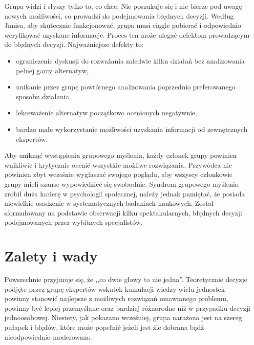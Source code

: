 Grupa widzi i słyszy tylko to, co chce. Nie poszukuje się i nie bierze pod uwagę 
nowych możliwości, co prowadzi do podejmowania błędnych decyzji. Według Janisa, 
aby skutecznie funkcjonować, grupa musi ciągle pobierać i odpowiednio
weryfikować uzyskane informacje. Proces ten może ulegać defektom prowadzącym do
błędnych decyzji. Najważniejsze defekty to:

\begin{itemize}
  \item ograniczenie dyskusji do rozważania zaledwie kilku działań bez
  analizowania pełnej gamy alternatyw,
  \item unikanie przez grupę powtórnego analizowania poprzednio preferowanego
  sposobu działania,
  \item lekceważenie alternatyw początkowo ocenionych negatywnie,
  \item bardzo małe wykorzystanie możliwości uzyskania informacji od
  zewnętrznych ekspertów.
\end{itemize}

Aby uniknąć wystąpienia grupowego myślenia, każdy członek grupy powinien
wnikliwie i krytycznie ocenić wszystkie możliwe rozwiązania. Przywódca nie
powinien zbyt wcześnie wygłaszać swojego poglądu, aby wszyscy członkowie grupy
mieli szanse wypowiedzieć się swobodnie. Syndrom grupowego myślenia zrobił duża
karierę w psychologii społecznej, należy jednak pamiętać, że posiada niewielkie
osadzenie w systematycznych badaniach naukowych. Został sformułowany na
podstawie obserwacji kilku spektakularnych, błędnych decyzji podejmowanych przez
wybitnych specjalistów.

\section{Zalety i wady}
Powszechnie przyjmuje się, że ,,co dwie głowy to nie jedna''. Teoretycznie
decyzje podjęte przez grupę ekspertów wskutek kumulacji wiedzy wielu jednostek 
powinny stanowić najlepsze z możliwych rozwiązań omawianego problemu, powinny
być lepiej przemyślane oraz bardziej różnorodne niż w przypadku decyzji
jednoosobowej. Niestety, jak pokazano wcześniej, grupa narażona jest na szereg
pułapek i błędów, które może popełnić jeżeli jest źle dobrana bądź
nieodpowiednio moderowana.

